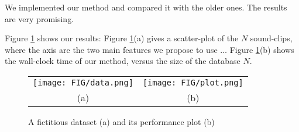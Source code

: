 We implemented our method
and compared it with the older ones.
The results are very promising.

Figure \ref{fig:results} shows our results:
Figure \ref{fig:results}(a) gives a scatter-plot
of the $N$ sound-clips, where the axis are the two main
features we propose to use $\ldots$
Figure \ref{fig:results}(b) shows the wall-clock time
of our method, versus the size of the database $N$.

\begin{figure}[htbf]
\begin{center}
\begin{tabular}{cc}
     \texttt{[image: FIG/data.png]} &
     \texttt{[image: FIG/plot.png]} \\
    (a) & (b) 
\end{tabular}
\caption{A fictitious dataset (a) and its performance plot (b)}
\label{fig:results}
\end{center}
\end{figure}

